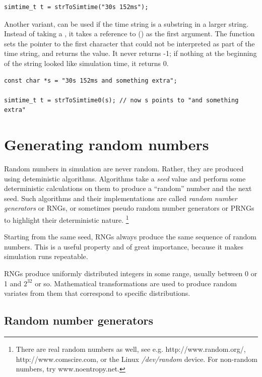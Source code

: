 \begin{verbatim}
simtime_t t = strToSimtime("30s 152ms");
\end{verbatim}

Another variant,  can be used if the time
string is a substring in a larger string. Instead of taking a ,
it takes a reference to  () as the first argument.  The
function sets the pointer to the first character that could not be
interpreted as part of the time string, and returns the value. It
never returns -1; if nothing at the beginning of the string looked
like simulation time, it returns 0.

\begin{verbatim}
const char *s = "30s 152ms and something extra";

simtime_t t = strToSimtime0(s); // now s points to "and something extra"
\end{verbatim}


\section{Generating random numbers}
\label{cha:sim-lib:generating-random-numbers}

Random numbers in simulation are never random. Rather, they are
produced using deteministic algorithms. Algorithms take a \textit{seed} value
and perform some deterministic calculations on them to produce
a ``random'' number and the next seed. Such algorithms and their
implementations are called \textit{random number generators} or RNGs,
or sometimes pseudo random number generators or PRNGs to highlight
their deterministic nature.
  \footnote{There are real random numbers as well, see e.g.
  http://www.random.org/, http://www.comscire.com, or the Linux
  \textit{/dev/random} device. For non-random numbers, try www.noentropy.net.}

Starting from the same seed, RNGs always produce the same sequence
of random numbers. This is a useful property and of great importance,
because it makes simulation runs repeatable.

RNGs produce uniformly distributed integers in some range,
usually between 0 or 1 and $2^{32}$ or so. Mathematical transformations
are used to produce random variates from them that correspond to
specific distributions.

\subsection{Random number generators}
\label{sec:sim-lib:rngs}

